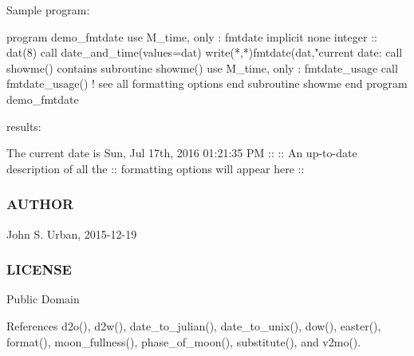 \begin{DoxyVerb}Sample program:

 program demo_fmtdate
 use M_time, only : fmtdate
 implicit none
 integer :: dat(8)
    call date_and_time(values=dat)
    write(*,*)fmtdate(dat,"current date: %
    call showme()
 contains
 subroutine showme()
    use M_time, only : fmtdate_usage
    call fmtdate_usage() ! see all formatting options
 end subroutine showme
 end program demo_fmtdate

results:

   The current date is Sun, Jul 17th, 2016 01:21:35 PM
    ::
    :: An up-to-date description of all the
    :: formatting options will appear here
    ::
\end{DoxyVerb}


\subsubsection*{A\+U\+T\+H\+OR}

John S. Urban, 2015-\/12-\/19 \subsubsection*{L\+I\+C\+E\+N\+SE}

Public Domain 

References d2o(), d2w(), date\+\_\+to\+\_\+julian(), date\+\_\+to\+\_\+unix(), dow(), easter(), format(), moon\+\_\+fullness(), phase\+\_\+of\+\_\+moon(), substitute(), and v2mo().

